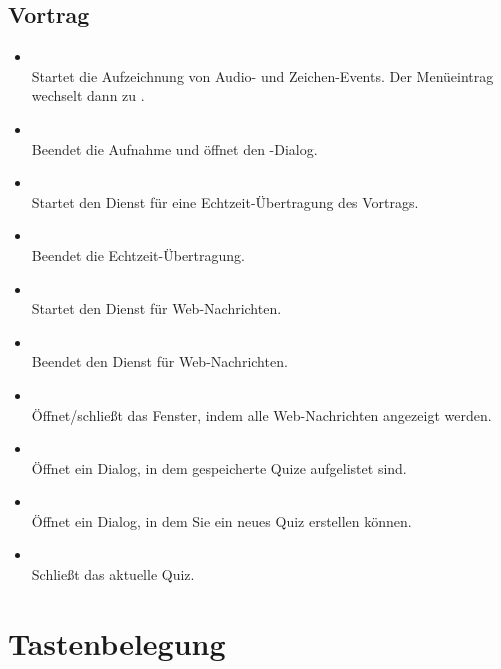 \subsection{Vortrag}
\begin{itemize}
\item {}\\Startet die Aufzeichnung von Audio- und Zeichen-Events. Der Menüeintrag wechselt dann zu .
\item {}\\Beendet die Aufnahme und öffnet den -Dialog.
\item {}\\ Startet den Dienst für eine Echtzeit-Übertragung des Vortrags.
\item {}\\ Beendet die Echtzeit-Übertragung.
\item {}\\ Startet den Dienst für Web-Nachrichten.
\item {}\\ Beendet den Dienst für Web-Nachrichten.
\item {}\\ Öffnet/schließt das Fenster, indem alle Web-Nachrichten angezeigt werden.
\item {}\\ Öffnet ein Dialog, in dem gespeicherte Quize aufgelistet sind.
\item {}\\ Öffnet ein Dialog, in dem Sie ein neues Quiz erstellen können.
\item {}\\ Schließt das aktuelle Quiz.
\end{itemize}
\vfill

\pagebreak
\section{Tastenbelegung}
\newcommand{\altKey}{Alt}
\newcommand{\ctrlKey}{Strg}
\newcommand{\shiftKey}{Shift}

